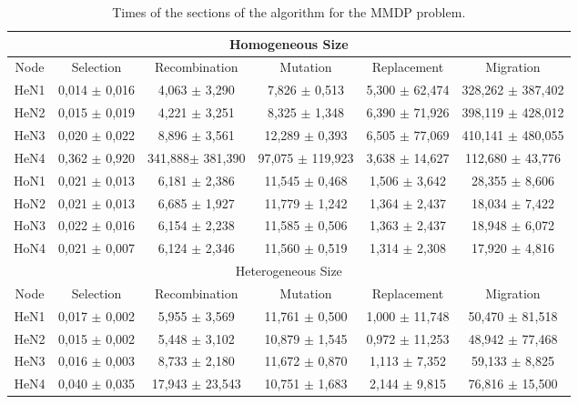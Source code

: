 \begin{table*}
\centering
\caption{Times of the sections of the algorithm for the MMDP problem.}
\begin{tabular}{|c|c|c|c|c|c|} \hline
\multicolumn{6}{|c|}{Homogeneous Size} \\ \hline
Node	& Selection		& Recombination		& Mutation		& Replacement		& Migration	        \\ \hline
HeN1	& 0,014	$\pm$ 0,016	& 4,063	$\pm$  3,290		& 7,826		$\pm$  	0,513	& 5,300 $\pm$ 62,474 &	328,262	$\pm$ 387,402 \\ \hline
HeN2	& 0,015	$\pm$ 0,019	& 4,221	$\pm$ 3,251			& 	8,325	$\pm$  	1,348	& 6,390	$\pm$ 71,926 &	398,119	$\pm$ 428,012 \\ \hline
HeN3	& 0,020	$\pm$ 0,022	& 8,896	$\pm$ 3,561			& 12,289	$\pm$  	0,393	& 6,505	$\pm$ 77,069 &	410,141	$\pm$ 480,055 \\ \hline
HeN4	& 0,362	$\pm$ 0,920	& 341,888$\pm$ 381,390		& 97,075	$\pm$  	119,923	& 3,638	$\pm$ 14,627 &	112,680	$\pm$ 43,776 \\ \hline \hline
HoN1	& 0,021	$\pm$ 0,013	& 6,181	$\pm$ 2,386			& 11,545	$\pm$  	0,468	& 1,506	$\pm$ 3,642	& 28,355	$\pm$ 8,606 \\ \hline
HoN2	& 0,021	$\pm$ 0,013	& 6,685	$\pm$ 1,927			& 11,779	$\pm$  	1,242	& 1,364	$\pm$ 2,437	& 18,034	$\pm$ 7,422 \\ \hline
HoN3	& 0,022	$\pm$ 0,016	& 6,154	$\pm$ 2,238			& 11,585	$\pm$  	0,506	& 1,363	$\pm$ 2,437	& 18,948	$\pm$ 6,072 \\ \hline
HoN4	& 0,021	$\pm$ 0,007	& 6,124	$\pm$ 2,346			& 11,560	$\pm$  	0,519	& 1,314	$\pm$ 2,308	& 17,920	$\pm$ 4,816 \\ \hline
\multicolumn{6}{|c|}{Heterogeneous Size} \\ \hline									
Node	& Selection		& Recombination		& Mutation		& Replacement		& Migration	\\ \hline
HeN1	& 0,017	$\pm$ 0,002	& 5,955	$\pm$ 3,569	    	& 11,761	$\pm$ 0,500		& 1,000	$\pm$ 11,748 & 50,470 $\pm$ 81,518 \\ \hline
HeN2	& 0,015	$\pm$ 0,002	& 5,448	$\pm$ 3,102			& 10,879	$\pm$ 1,545		& 0,972	$\pm$ 11,253 & 48,942 $\pm$ 77,468 \\ \hline
HeN3	& 0,016	$\pm$ 0,003	& 8,733	$\pm$ 2,180			& 11,672	$\pm$ 0,870		& 1,113	$\pm$ 7,352	& 59,133 $\pm$ 	8,825 \\ \hline
HeN4	& 0,040	$\pm$ 0,035	& 17,943 $\pm$ 23,543		& 10,751	$\pm$ 1,683		& 2,144	$\pm$ 9,815	& 76,816 $\pm$ 15,500 \\ \hline \hline

\end{tabular}
\end{table*}
